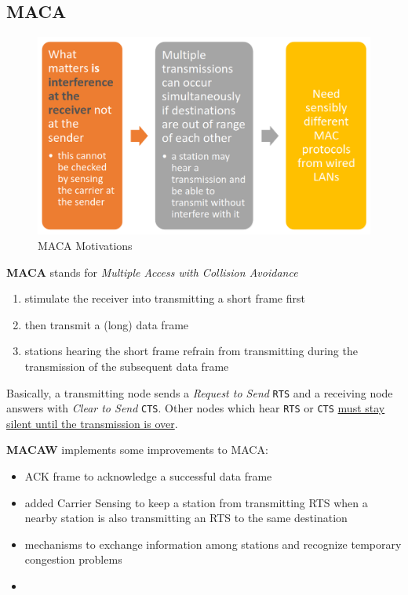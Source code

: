 \subsection{MACA}
\begin{figure}[htbp]
   \centering
   \includegraphics{images/MACA_motivations.png}
   \caption{MACA Motivations}
   \label{fig:MACA_motivations}
\end{figure}

\textbf{MACA} stands for \textit{Multiple Access with Collision Avoidance}
\begin{enumerate}
   \item stimulate the receiver into transmitting a short
   frame first
   \item then transmit a (long) data frame
   \item stations hearing the short frame refrain from
   transmitting during the transmission of the
   subsequent data frame
\end{enumerate}

Basically, a transmitting node sends a \textit{Request to Send} \texttt{RTS} and a receiving node answers with \textit{Clear to Send} \texttt{CTS}.
Other nodes which hear \texttt{RTS} or \texttt{CTS} \ul{must stay silent until the transmission is over}.

\nl

\textbf{MACAW} implements some improvements to MACA:
\begin{itemize}
   \item ACK frame to acknowledge a
   successful data frame
   \item added Carrier Sensing to keep a station from
   transmitting RTS when a nearby station is also
   transmitting an RTS to the same destination
   \item mechanisms to exchange information among
   stations and recognize temporary congestion
   problems
   \item[] 
\end{itemize}